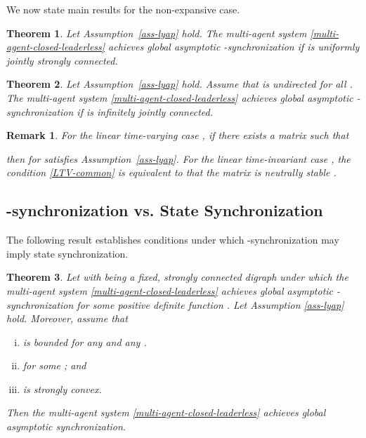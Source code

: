 \documentclass[a4paper, 11pt]{article}
\newtheorem{theorem}{Theorem}
\newtheorem{remark}{Remark}
\begin{document}
We now state main results for the non-expansive case.
\begin{theorem}\label{thm1-leaderless}
Let Assumption~\ref{ass-lyap} hold.
The multi-agent system \eqref{multi-agent-closed-leaderless} achieves
global asymptotic -synchronization if  is uniformly jointly strongly connected.
\end{theorem}


\begin{theorem}\label{thm2-leaderless}
Let Assumption~\ref{ass-lyap} hold.
Assume that  is undirected for all .
The multi-agent system \eqref{multi-agent-closed-leaderless} achieves global asymptotic -synchronization if  is infinitely jointly connected.
\end{theorem}

\begin{remark}\label{remark-ass-stable}
For the linear time-varying case , if there exists a matrix  such that

then  for  satisfies Assumption~\ref{ass-lyap}.
For the linear time-invariant case , the condition \eqref{LTV-common} is
equivalent to that the matrix  is neutrally stable \cite{su-huang-tac}.
\end{remark}





\subsection{-synchronization vs. State Synchronization}\label{discussion-phi-state}
The following result establishes conditions under which -synchronization may imply state synchronization.

\begin{theorem}\label{prop-guodong}
Let  with  being a fixed, strongly connected digraph under which the multi-agent system \eqref{multi-agent-closed-leaderless} achieves global asymptotic -synchronization
for some positive definite function .
Let Assumption \ref{ass-lyap} hold.
Moreover, assume that
\begin{enumerate}[(i).]
\item  is bounded for any  and any .
\item  for some ; and
\item  is strongly convex.
\end{enumerate}
Then the multi-agent system \eqref{multi-agent-closed-leaderless} achieves global asymptotic synchronization.
\end{theorem}
\end{document}
